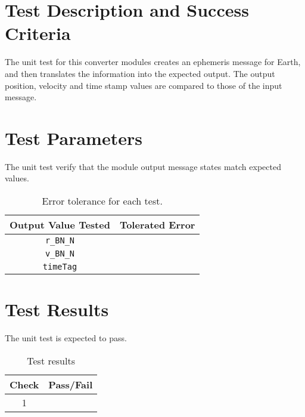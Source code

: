 
\section{Test Description and Success Criteria}
The unit test for this converter modules creates an ephemeris message for Earth, and then translates the information into the expected output.  The output position, velocity and time stamp values are compared to those of the input message.



\section{Test Parameters}

The unit test verify that the module output  message states match expected values.
\begin{table}[htbp]
	\caption{Error tolerance for each test.}
	\label{tab:errortol}
	\centering \fontsize{10}{10}\selectfont
	\begin{tabular}{ c | c } %
		\hline\hline
		\textbf{Output Value Tested}  & \textbf{Tolerated Error}  \\ 
		\hline
		{\tt r\_BN\_N}        & 	   \\ 
		{\tt v\_BN\_N}        & 	   \\ 
		{\tt timeTag}        & 	   \\ 
		\hline\hline
	\end{tabular}
\end{table}




\section{Test Results}
The unit test is expected to pass.
\begin{table}[H]
	\caption{Test results}
	\label{tab:results}
	\centering \fontsize{10}{10}\selectfont
	\begin{tabular}{c | c  } %
		\hline\hline
		\textbf{Check} &\textbf{Pass/Fail} \\ 
		\hline
	   1	   			&  \\ 
	   \hline\hline
	\end{tabular}
\end{table}


